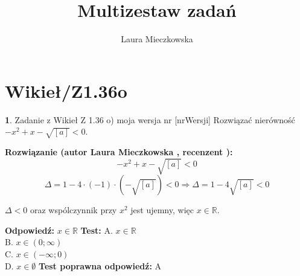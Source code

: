 \documentclass[12pt, a4paper]{article}
\title{Multizestaw zadań}
\author{Laura Mieczkowska}
\date{}
\theoremstyle{definition} %
\newtheorem{zad}{}
\newcommand{\kategoria}[1]{\section{#1}} %
\newcommand{\zadStart}[1]{\begin{zad}#1\newline} %
\newcommand{\zadStop}{\end{zad}}   %
\newcommand{\rozwStart}[2]{\noindent \textbf{Rozwiązanie (autor #1 , recenzent #2): }\newline} %
\newcommand{\odpStart}{\noindent \textbf{Odpowiedź:}\newline}    %
\newcommand{\odpStop}{\newline}                                             %
\newcommand{\testStart}{\noindent \textbf{Test:}\newline} %
\newcommand{\testStop}{\newline} %
\newcommand{\kluczStart}{\noindent \textbf{Test poprawna odpowiedź:}\newline} %
\newcommand{\kluczStop}{\newline} %
\begin{document}
\maketitle


\kategoria{Wikieł/Z1.36o}
\zadStart{Zadanie z Wikieł Z 1.36 o) moja wersja nr [nrWersji]}
Rozwiązać nierówność $-x^2+x-\sqrt{[a]}<0$.
\zadStop
\rozwStart{Laura Mieczkowska}{}
$$-x^2+x-\sqrt{[a]}<0$$
$$\Delta=1-4\cdot(-1)\cdot(-\sqrt{[a]})<0\Rightarrow \Delta=1-4\sqrt{[a]}<0$$

$\Delta<0$ oraz wspólczynnik przy $x^2$ jest ujemny, więc $x\in\mathbb{R}$.

\odpStart
$x\in\mathbb{R}$
\odpStop
\testStart
A. $x\in\mathbb{R}$\\
B. $x\in(0;\infty)$ \\
C. $x\in(-\infty;0)$ \\
D. $x\in\emptyset$ 
\testStop
\kluczStart
A
\kluczStop
\end{document}
